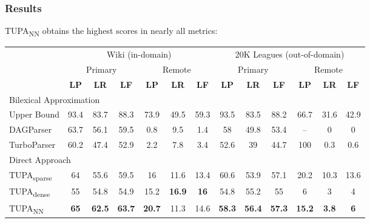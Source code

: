 \documentclass[t]{beamer}
\newcommand{\parser}[1]{TUPA\textsubscript{#1}}
\begin{document}
\begin{frame}
\frametitle{Results}
\parser{NN} obtains the highest scores in nearly all metrics:
	  
\begin{center}
	\begin{tabular}{l|ccc|ccc||ccc|ccc}
	& \multicolumn{6}{c||}{Wiki (in-domain)} & \multicolumn{6}{c}{20K Leagues (out-of-domain)} \\
	& \multicolumn{3}{c|}{Primary} & \multicolumn{3}{c||}{Remote}
	& \multicolumn{3}{c|}{Primary} & \multicolumn{3}{c}{Remote} \\
	& \textbf{LP} & \textbf{LR} & \textbf{LF} & \textbf{LP} & \textbf{LR} & \textbf{LF}
	& \textbf{LP} & \textbf{LR} & \textbf{LF} & \textbf{LP} & \textbf{LR} & \textbf{LF} \\
	\hline
	\multicolumn{4}{l}{\rule{0pt}{2ex} \footnotesize Bilexical Approximation} \\
	Upper Bound %
	& 93.4 & 83.7 & 88.3 & 73.9 & 49.5 & 59.3
	& 93.5 & 83.5 & 88.2 & 66.7 & 31.6 & 42.9 \vspace{.1cm} \\
	DAGParser \cite{ribeyre-villemontedelaclergerie-seddah:2014:SemEval}
	& 63.7 & 	56.1	 & 59.5	 & 0.8	 & 9.5	 &  1.4
	& 58	 & 49.8	 & 53.4 & -- & 0 & 0 \\
	TurboParser \cite{almeida-martins:2015:SemEval}
	& 60.2	 & 47.4	 & 52.9	 & 2.2	 & 7.8	 &  3.4
	& 52.6	 & 39	 & 44.7	 & 100	 & 0.3	 & 0.6 \\
	\hline
	\multicolumn{4}{l}{\rule{0pt}{2ex} \footnotesize Direct Approach} \\
	\parser{sparse}
	& 64 & 55.6 & 59.5 & 16 & 11.6 & 13.4 
	& 60.6 & 53.9 & 57.1 & 20.2 & 10.3 & 13.6 \\
	\parser{dense} 
	& 55 & 54.8 & 54.9 & 15.2 & {\bf 16.9} & {\bf 16}
	& 54.8 & 55.2 & 55 & 6 & 3 & 4 \\
	\parser{NN}
	& {\bf 65} & {\bf 62.5} & {\bf 63.7} & {\bf 20.7} & 11.3 & 14.6
	& {\bf 58.3} & {\bf 56.4} & {\bf 57.3} & {\bf 15.2} & {\bf 3.8} & {\bf 6}
	\end{tabular}
\end{center}
\end{frame}
\end{document}
